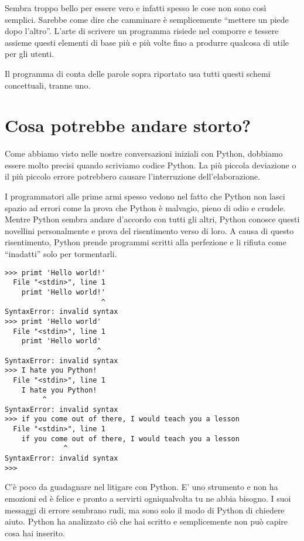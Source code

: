 Sembra troppo bello per essere vero e infatti spesso le cose non sono cos\`{i} semplici. Sarebbe come dire che camminare \`{e} semplicemente {``}mettere un piede dopo l'altro''. L'arte di scrivere un programma risiede nel comporre e tessere assieme questi elementi di base pi\`{u} e pi\`{u} volte fino a produrre qualcosa di utile per gli utenti. 

Il programma di conta delle parole sopra riportato usa tutti questi schemi concettuali, tranne uno.

\section{Cosa potrebbe andare storto?}

Come abbiamo visto nelle nostre conversazioni iniziali con Python, dobbiamo essere molto precisi quando scriviamo codice Python. La pi\`{u} piccola deviazione o il pi\`{u} piccolo errore potrebbero causare l'interruzione dell'elaborazione.


I programmatori alle prime armi spesso vedono nel fatto che Python non lasci spazio ad errori come la prova che Python \`{e} malvagio, pieno di odio e crudele. Mentre Python sembra andare d'accordo con tutti gli altri, Python conosce questi novellini personalmente e prova del risentimento verso di loro. A causa di questo risentimento, Python prende programmi scritti alla perfezione e li rifiuta come {``}inadatti'' solo per tormentarli.

\beforeverb
\begin{verbatim}
>>> primt 'Hello world!'
  File "<stdin>", line 1
    primt 'Hello world!'
                       ^
SyntaxError: invalid syntax
>>> primt 'Hello world'
  File "<stdin>", line 1
    primt 'Hello world'
                      ^
SyntaxError: invalid syntax
>>> I hate you Python!
  File "<stdin>", line 1
    I hate you Python!
         ^
SyntaxError: invalid syntax
>>> if you come out of there, I would teach you a lesson
  File "<stdin>", line 1
    if you come out of there, I would teach you a lesson
              ^
SyntaxError: invalid syntax
>>> 
\end{verbatim}
\afterverb
%
C'\`{e} poco da guadagnare nel litigare con Python. E' uno strumento e non ha emozioni ed \`{e} felice e pronto a servirti ogniqualvolta tu ne abbia bisogno. I suoi messaggi di errore sembrano rudi, ma sono solo il modo di Python di chiedere aiuto. Python ha analizzato ci\`{o} che hai scritto e semplicemente non pu\`{o} capire cosa hai inserito.


